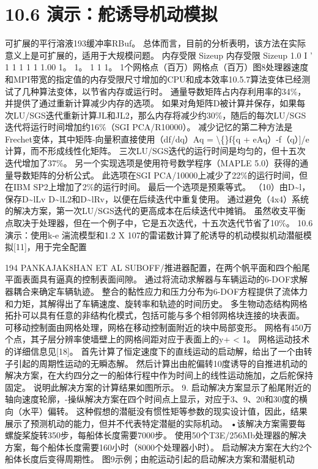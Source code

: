 \documentclass[UTF8,11pt,a4paper,openany,fontset=fandol]{ctexbook}
\begin{document}
\section{10.6 演示：舵诱导机动模拟}
可扩展的平行溶液193缓冲率RBuf。 总体而言，目前的分析表明，该方法在实际意义上是可扩展的，适用于大规模问题。 内存受限 Sizeup 内存受限 Sizeup 1.0 I ' 1 1 1 1 1 1.00 1。 1。 1 1 1。 1个网格点（百万）网格点（百万）图8处理器速度和MPI带宽的指定值的内存受限尺寸增加的CPU和成本效率10.5.7算法变体已经测试了几种算法变体，以节省内存或运行时。 通量导数矩阵占内存利用率的34\%，并提供了通过重新计算减少内存的选项。 如果对角矩阵D被计算并保存，如果每次LU/SGS迭代重新计算JL和JL2，那么内存将减少约30\%，随后的每次LU/SGS迭代将运行时间增加约16\%（SGI PCA/R10000）。 减少记忆的第二种方法是Frechet变体，其中矩阵-向量积直接使用（df/dq）Aq = \textbackslash\{\}f\{q + eAq）-f（q）]/e计算，而不形成线性化矩阵。 三次LU/SGS迭代的运行时间是均匀的，但十五次迭代增加了37\%。 另一个实现选项是使用符号数学程序（MAPLE 5.0）获得的通量导数矩阵的分析公式。 此选项在SGI PCA/10000上减少了22\%的运行时间，但在IBM SP2上增加了2\%的运行时间。 最后一个选项是预乘等式。 （10）由D\textasciitilde{}l，保存D\textasciitilde{}lLv D\textasciitilde{}lL2和D\textasciitilde{}lRv，以便在后续迭代中重复使用。 通过避免（4x4）系统的解决方案，第一次LU/SGS迭代的更高成本在后续迭代中摊销。 虽然收支平衡点取决于处理器，但在一个例子中，它是五次迭代，十五次迭代节省了10\%。 10.6 演示：使用k-e 湍流模型和1.2 X 107的雷诺数计算了舵诱导的机动模拟机动潜艇模拟[11]，用于完全配置

194 PANKAJAK8HAN ET AL SUBOFF/推进器配置，在两个帆平面和四个船尾平面表面具有逼真的控制表面间隙。 通过将流动求解器与车辆运动的6-DOF求解器耦合来确定车辆轨迹。 整合的黏性应力和压力分布为6-DOF方程提供了流体力和力矩，其解得出了车辆速度、旋转率和轨迹的时间历史。 多生物动态结构网格拓扑可以具有任意的非结构化模式，包括可能与多个相邻网格块连接的块表面。 可移动控制面由网格处理，网格在移动控制面附近的块中局部变形。 网格有450万个点，其子层分辨率使墙壁上的网格间距对应于表面上的y+ < 1。 网格运动技术的详细信息见[18]。 首先计算了恒定速度下的直线运动的启动解，给出了一个由转子引起的周期性运动的无瞬态解。 然后计算出由舵偏转10度诱导的自推进机动的解决方案，在大约四分之一的船体行程中作为时间上的线性运动施加，之后舵保持固定。 说明此解决方案的计算结果如图所示。 9. 启动解决方案显示了船尾附近的轴向速度轮廓，-操纵解决方案在四个时间点上显示，对应于3、9、20和30度的横向（水平）偏转。 这种假想的潜艇没有惯性矩等参数的现实设计值，因此，结果展示了预测机动的能力，但并不代表特定潜艇的实际机动。 •该解决方案需要每螺旋桨旋转350步，每船体长度需要7000步。 使用50个T3E/256Mb处理器的解决方案，每个船体长度需要160小时（8000个处理器小时）。 启动解决方案在大约2个船体长度后变得周期性。 图9示例；由舵运动引起的启动解决方案和潜艇机动
\end{document}
